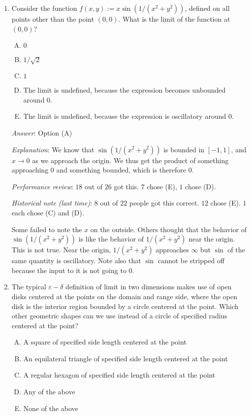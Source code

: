 \documentclass[10pt]{amsart}
\begin{document}
\begin{enumerate}
\item Consider the function $f(x,y) := x \sin(1/(x^2 + y^2))$, defined
  on all points other than the point $(0,0)$. What is the limit of the
  function at $(0,0)$?

  \begin{enumerate}[(A)]
  \item $0$
  \item $1/\sqrt{2}$
  \item $1$
  \item The limit is undefined, because the expression becomes unbounded around $0$.
  \item The limit is undefined, because the expression is oscillatory
    around $0$.
  \end{enumerate}

  {\em Answer}: Option (A)

  {\em Explanation}: We know that $\sin(1/(x^2 + y^2))$ is bounded in
  $[-1,1]$, and $x \to 0$ as we approach the origin. We thus get the
  product of something approaching $0$ and something bounded, which is
  therefore $0$.

  {\em Performance review}: $18$ out of $26$ got this. $7$ chose (E),
  $1$ chose (D).

  {\em Historical note (last time)}: $8$ out of $22$ people got this
  correct. $12$ chose (E). $1$ each chose (C) and (D).

 Some failed to note the $x$ on the outside. Others thought that the
  behavior of $\sin(1/(x^2 + y^2))$ is like the behavior of $1/(x^2 +
  y^2)$ near the origin. This is not true. Near the origin, $1/(x^2 +
  y^2)$ approaches $\infty$ but $\sin$ of the same quantity is
  oscillatory. Note also that $\sin$ cannot be stripped off because
  the input to it is not going to $0$.
\item The typical $\varepsilon-\delta$ definition of limit in two
  dimensions makes use of open disks centered at the points on the
  domain and range side, where the open disk is the interior region
  bounded by a circle centered at the point. Which other geometric
  shapes can we use instead of a circle of specified radius centered
  at the point?

  \begin{enumerate}[(A)]
  \item A square of specified side length centered at the point
  \item An equilateral triangle of specified side length centered at the point
  \item A regular hexagon of specified side length centered at the point
  \item Any of the above
  \item None of the above
  \end{enumerate}


\end{enumerate}
\end{document}
